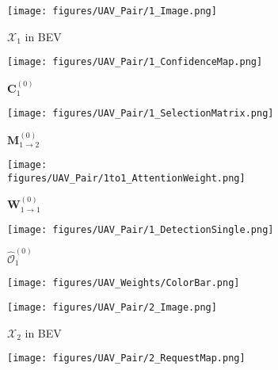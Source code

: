 \documentclass{article}
\begin{document}
\begin{figure}[!t]

  \centering
\begin{subfigure}{0.18\linewidth}
    \texttt{[image: figures/UAV\_Pair/1\_Image.png]}
    \vspace{-5mm}
    \caption{$\mathcal{X}_1$ in BEV}
    \label{fig:UAV_BEVImage1}
  \end{subfigure}
\begin{subfigure}{0.18\linewidth}
    \texttt{[image: figures/UAV\_Pair/1\_ConfidenceMap.png]}
    \vspace{-5mm}
    \caption{$\mathbf{C}_1^{(0)}$}
    \label{fig:UAV_ConfMap1}
  \end{subfigure}
  \begin{subfigure}{0.18\linewidth}
    \texttt{[image: figures/UAV\_Pair/1\_SelectionMatrix.png]}
    \vspace{-5mm}
    \caption{$\mathbf{M}_{1\rightarrow 2}^{(0)}$}
    \label{fig:UAV_SelectMat1}
  \end{subfigure}
  \begin{subfigure}{0.18\linewidth}
    \texttt{[image: figures/UAV\_Pair/1to1\_AttentionWeight.png]}
    \vspace{-5mm}
    \caption{$\mathbf{W}_{1\rightarrow 1}^{(0)}$}
    \label{fig:UAV_AttenWeight1to1}
  \end{subfigure}
\begin{subfigure}{0.18\linewidth}
    \texttt{[image: figures/UAV\_Pair/1\_DetectionSingle.png]}
    \vspace{-5mm}
    \caption{$\widehat{\mathcal{O}}_{1}^{(0)}$}
    \label{fig:UAV_DetectionBeforeComm}
  \end{subfigure}
  \begin{subfigure}{0.04\linewidth}
    \texttt{[image: figures/UAV\_Weights/ColorBar.png]}
\end{subfigure}
  \centering
  \begin{subfigure}{0.18\linewidth}
    \texttt{[image: figures/UAV\_Pair/2\_Image.png]}
    \vspace{-5mm}
    \caption{$\mathcal{X}_2$ in BEV}
    \label{fig:UAV_BEVImage2}
  \end{subfigure}
\begin{subfigure}{0.18\linewidth}
    \texttt{[image: figures/UAV\_Pair/2\_RequestMap.png]}
    \vspace{-5mm}

\end{subfigure}
\end{figure}
\end{document}
